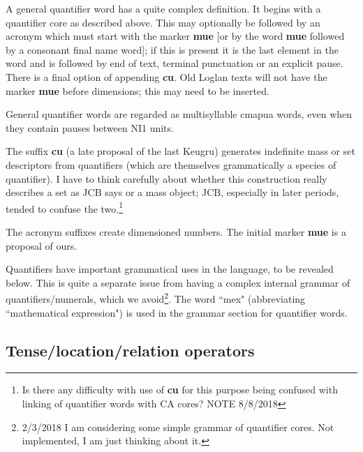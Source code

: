 \documentclass[12pt]{book}
\begin{document}
A general quantifier word has a quite complex definition.   It begins with a quantifier core as described above.  This may optionally be followed by an acronym which must start with the marker {\bf mue} [or by the word {\bf mue} followed by a consonant final name word]; if this is present it is the last element in the word and is followed by end of text, terminal punctuation or an explicit pause.  There is a final option of appending {\bf cu}.   Old Loglan texts will not have the marker {\bf mue} before dimensions;  this may need to be inserted.

General quantifier words are regarded as multisyllable cmapua words, even when they contain pauses between NI1 units.

The suffix {\bf cu} (a late proposal of the last Keugru) generates indefinite mass  or set descriptors from quantifiers
(which are themselves grammatically a species of quantifier).  I have to think carefully about whether this construction really describes a set as JCB says or a mass object; JCB, especially in later periods, tended to confuse the two.\footnote{Is there any difficulty with use of {\bf cu} for this purpose being confused with linking of quantifier words with CA cores?  NOTE 8/8/2018}

The acronym suffixes create dimensioned numbers.   The initial marker {\bf mue} is a proposal of ours.

Quantifiers have important grammatical uses in the language, to be revealed below.   This is quite a separate issue from having a complex internal grammar of quantifiers/numerals, which we avoid\footnote{2/3/2018 I am considering some simple grammar of quantifier cores.  Not implemented, I am just thinking about it.}.   The word ``mex" (abbreviating ``mathematical expression") is used in the grammar section for quantifier words.

\subsection{Tense/location/relation operators}
\end{document}
